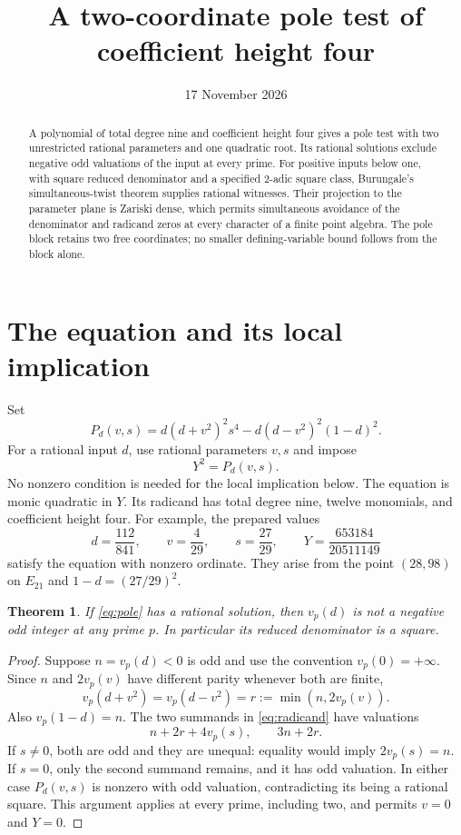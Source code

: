 \documentclass[11pt,a4paper]{article}
\title{A two-coordinate pole test of coefficient height four}
\author{}\date{17 November 2026}
\newtheorem{theorem}{Theorem}[section]
\begin{document}
\maketitle

\begin{abstract}
A polynomial of total degree nine and coefficient height four gives a
pole test with two unrestricted rational parameters and one quadratic
root. Its rational solutions exclude negative odd valuations of the
input at every prime. For positive inputs below one, with square
reduced denominator and a specified $2$-adic square class, Burungale's
simultaneous-twist theorem supplies rational witnesses. Their projection
to the parameter plane is Zariski dense, which permits simultaneous
avoidance of the denominator and radicand zeros at every character of a
finite point algebra. The pole block retains two free coordinates; no
smaller defining-variable bound follows from the block alone.
\end{abstract}

\section{The equation and its local implication}

Set
\begin{equation}\label{eq:radicand}
 P_d(v,s)=d(d+v^2)^2s^4-d(d-v^2)^2(1-d)^2.
\end{equation}
For a rational input $d$, use rational parameters $v,s$ and impose
\begin{equation}\label{eq:pole}
 Y^2=P_d(v,s).
\end{equation}
No nonzero condition is needed for the local implication below.
The equation is monic quadratic in $Y$. Its radicand has total degree
nine, twelve monomials, and coefficient height four.
For example, the prepared values
\[
 d=\frac{112}{841},\qquad v=\frac4{29},\qquad s=\frac{27}{29},\qquad
 Y=\frac{653184}{20511149}
\]
satisfy the equation with nonzero ordinate. They arise from the
point $(28,98)$ on $E_{21}$ and $1-d=(27/29)^2$.

\begin{theorem}\label{thm:local}
If \eqref{eq:pole} has a rational solution, then $v_p(d)$ is not a
negative odd integer at any prime $p$. In particular its reduced
denominator is a square.
\end{theorem}
\begin{proof}
Suppose $n=v_p(d)<0$ is odd and use the convention $v_p(0)=+\infty$.
Since $n$ and $2v_p(v)$ have different parity whenever both are finite,
\[
 v_p(d+v^2)=v_p(d-v^2)=r:=\min(n,2v_p(v)).
\]
Also $v_p(1-d)=n$. The two summands in \eqref{eq:radicand} have
valuations
\[
 n+2r+4v_p(s),\qquad 3n+2r.
\]
If $s\ne0$, both are odd and they are unequal: equality would imply
$2v_p(s)=n$. If $s=0$, only the second summand remains, and it has
odd valuation. In either case $P_d(v,s)$ is nonzero with odd valuation,
contradicting its being a rational square. This argument applies at
every prime, including two, and permits $v=0$ and $Y=0$.
\end{proof}
\end{document}
